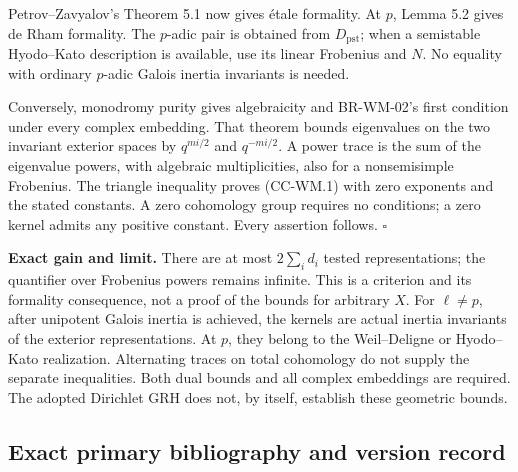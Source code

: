 \documentclass[11pt,a4paper]{article}
\theoremstyle{definition}\newtheorem{definition}[theorem]{Definition}
\theoremstyle{remark}\newtheorem{remark}[theorem]{Remark}
\begin{document}
Petrov--Zavyalov's Theorem 5.1 now gives étale formality. At \(p\),
Lemma 5.2 gives de Rham formality. The \(p\)-adic pair is obtained from
\(D_{\mathrm{pst}}\); when a semistable Hyodo--Kato description is
available, use its linear Frobenius and \(N\). No equality with ordinary
\(p\)-adic Galois inertia invariants is needed.

Conversely, monodromy purity gives algebraicity and BR-WM-02's first
condition under every complex embedding. That theorem bounds eigenvalues
on the two invariant exterior spaces by \(q^{mi/2}\) and \(q^{-mi/2}\).
A power trace is the sum of the eigenvalue powers, with algebraic
multiplicities, also for a nonsemisimple Frobenius. The triangle
inequality proves (CC-WM.1) with zero exponents and the stated
constants. A zero cohomology group requires no conditions; a zero kernel
admits any positive constant. Every assertion follows. \(\square\)

\textbf{Exact gain and limit.} There are at most \(2\sum_i d_i\) tested
representations; the quantifier over Frobenius powers remains infinite.
This is a criterion and its formality consequence, not a proof of the
bounds for arbitrary \(X\). For \(\ell\ne p\), after unipotent Galois
inertia is achieved, the kernels are actual inertia invariants of the
exterior representations. At \(p\), they belong to the Weil--Deligne or
Hyodo--Kato realization. Alternating traces on total cohomology do not
supply the separate inequalities. Both dual bounds and all complex
embeddings are required. The adopted Dirichlet GRH does not, by itself,
establish these geometric bounds.

\subsection{Exact primary bibliography and version
record}\label{exact-primary-bibliography-and-version-record}
\end{document}
